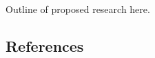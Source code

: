 \documentclass[12pt]{article}
\begin{document}
\pagestyle{fancy}
\rhead{\thepage}
\cfoot{} %
\renewcommand{\headrulewidth}{0pt}
\renewcommand{\footrulewidth}{0pt}

Outline of proposed research here.

\newpage
\subsection*{References}
\end{document}
